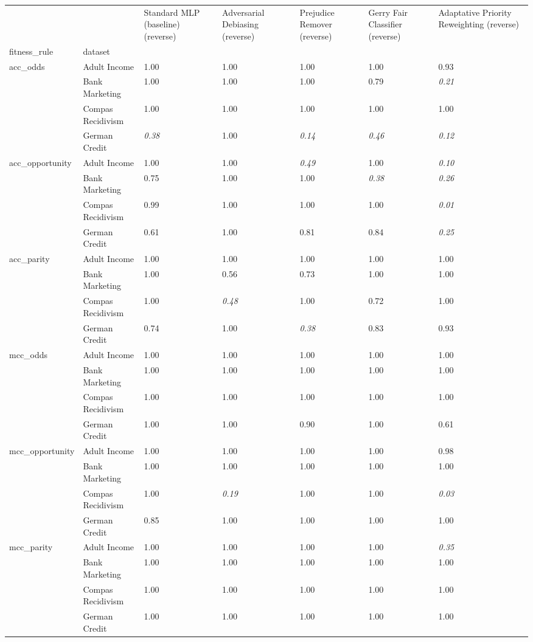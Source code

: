 \begin{tabular}{lllllll}
\toprule
 &  & Standard MLP (baseline) (reverse) & Adversarial Debiasing (reverse) & Prejudice Remover (reverse) & Gerry Fair Classifier (reverse) & Adaptative Priority Reweighting (reverse) \\
fitness_rule & dataset &  &  &  &  &  \\
\midrule
\multirow[t]{4}{*}{acc_odds} & Adult Income & 1.00 & 1.00 & 1.00 & 1.00 & 0.93 \\
 & Bank Marketing & 1.00 & 1.00 & 1.00 & 0.79 & \textit{0.21} \\
 & Compas Recidivism & 1.00 & 1.00 & 1.00 & 1.00 & 1.00 \\
 & German Credit & \textit{0.38} & 1.00 & \textit{0.14} & \textit{0.46} & \textit{0.12} \\
\cline{1-7}
\multirow[t]{4}{*}{acc_opportunity} & Adult Income & 1.00 & 1.00 & \textit{0.49} & 1.00 & \textit{0.10} \\
 & Bank Marketing & 0.75 & 1.00 & 1.00 & \textit{0.38} & \textit{0.26} \\
 & Compas Recidivism & 0.99 & 1.00 & 1.00 & 1.00 & \textit{0.01} \\
 & German Credit & 0.61 & 1.00 & 0.81 & 0.84 & \textit{0.25} \\
\cline{1-7}
\multirow[t]{4}{*}{acc_parity} & Adult Income & 1.00 & 1.00 & 1.00 & 1.00 & 1.00 \\
 & Bank Marketing & 1.00 & 0.56 & 0.73 & 1.00 & 1.00 \\
 & Compas Recidivism & 1.00 & \textit{0.48} & 1.00 & 0.72 & 1.00 \\
 & German Credit & 0.74 & 1.00 & \textit{0.38} & 0.83 & 0.93 \\
\cline{1-7}
\multirow[t]{4}{*}{mcc_odds} & Adult Income & 1.00 & 1.00 & 1.00 & 1.00 & 1.00 \\
 & Bank Marketing & 1.00 & 1.00 & 1.00 & 1.00 & 1.00 \\
 & Compas Recidivism & 1.00 & 1.00 & 1.00 & 1.00 & 1.00 \\
 & German Credit & 1.00 & 1.00 & 0.90 & 1.00 & 0.61 \\
\cline{1-7}
\multirow[t]{4}{*}{mcc_opportunity} & Adult Income & 1.00 & 1.00 & 1.00 & 1.00 & 0.98 \\
 & Bank Marketing & 1.00 & 1.00 & 1.00 & 1.00 & 1.00 \\
 & Compas Recidivism & 1.00 & \textit{0.19} & 1.00 & 1.00 & \textit{0.03} \\
 & German Credit & 0.85 & 1.00 & 1.00 & 1.00 & 1.00 \\
\cline{1-7}
\multirow[t]{4}{*}{mcc_parity} & Adult Income & 1.00 & 1.00 & 1.00 & 1.00 & \textit{0.35} \\
 & Bank Marketing & 1.00 & 1.00 & 1.00 & 1.00 & 1.00 \\
 & Compas Recidivism & 1.00 & 1.00 & 1.00 & 1.00 & 1.00 \\
 & German Credit & 1.00 & 1.00 & 1.00 & 1.00 & 1.00 \\
\cline{1-7}
\bottomrule
\end{tabular}
